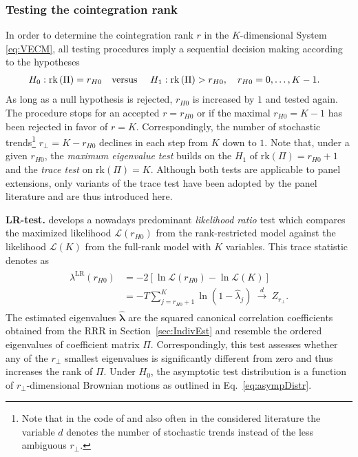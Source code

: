 \subsubsection{Testing the cointegration rank} \label{sec:IndivTest}
In order to determine the cointegration rank $ r $ in the $ K $-dimensional System \eqref{eq:VECM}, all testing procedures imply a sequential decision making according to the hypotheses 
\begin{align} \label{eq:RankHypo}
\begin{split}
	H_0: \text{rk}\left( \Pi \right) = r_{H0} & \text{\quad versus \quad} H_1: \text{rk} \left( \Pi \right) > r_{H0}, \quad r_{H0}=0, \ldots, K-1.
\end{split}
\end{align}
As long as a null hypothesis is rejected, $r_{H0}$ is increased by $1$ and tested again. The procedure stops for an accepted $ r = r_{H0} $ or if the maximal $r_{H0} = K - 1$ has been rejected in favor of $ r = K $. Correspondingly, the number of stochastic trends\footnote{Note that in the  code of  and also often in the considered literature the variable $d$ denotes the number of stochastic trends instead of the less ambiguous $ r_\perp $.} $ r_\perp = K - r_{H0} $ declines in each step from $K$ down to $1$. Note that, under a given $r_{H0}$, the \textit{maximum eigenvalue test} builds on the $ H_ 1 $ of $ \text{rk}(\Pi) = r_{H0} + 1 $ and the \textit{trace test} on $ \text{rk}(\Pi) = K $. Although both tests are applicable to panel extensions, only variants of the trace test have been adopted by the panel literature and are thus introduced here.


\textbf{LR-test.} \citet{Johansen1988} develops a nowadays predominant \textit{likelihood ratio} test which compares the maximized likelihood $ \mathcal{L}(r_{H0}) $ from the rank-restricted model against the likelihood $ \mathcal{L}(K) $ from the full-rank model with $ K $ variables. This trace statistic denotes as
\begin{align} \label{eq:LRrank}
\begin{split}
	\lambda^{\text{LR}} \left( r_{H0} \right) & = -2 \left[ \ln \mathcal{L}(r_{H0}) - \ln \mathcal{L}(K) \right] \\
	& = -T \sum_{j=r_{H0}+1}^{K} \ln(1-\hat{\lambda}_j) \ \overset{d}{\longrightarrow} \ Z_{r_\perp}. 
\end{split}
\end{align}
The estimated eigenvalues $ \boldsymbol{\hat{\lambda}} $ are the squared canonical correlation coefficients obtained from the RRR in Section~\ref{sec:IndivEst} and resemble the ordered eigenvalues of coefficient matrix $ \Pi $. Correspondingly, this test assesses whether any of the $ r_\perp $ smallest eigenvalues is significantly different from zero and thus increases the rank of $ \Pi $. Under $ H_0 $, the asymptotic test distribution is a function of $ r_\perp $-dimensional Brownian motions as outlined in Eq.~\eqref{eq:asympDistr}.


